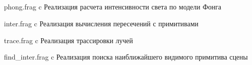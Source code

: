 \begin{appendices}
	\chapter{}
	{phong.frag} %
	{c} %
	{Реализация расчета интенсивности света по модели Фонга} %


	{inter.frag} %
	{c} %
	{Реализация вычисления пересечений с примитивами} %

	{trace.frag} %
	{c} %
	{Реализация трассировки лучей} %

	{find_inter.frag} %
	{c} %
	{Реализация поиска наиближайшего видимого примитива сцены} %
	
	
\end{appendices}
	
	
